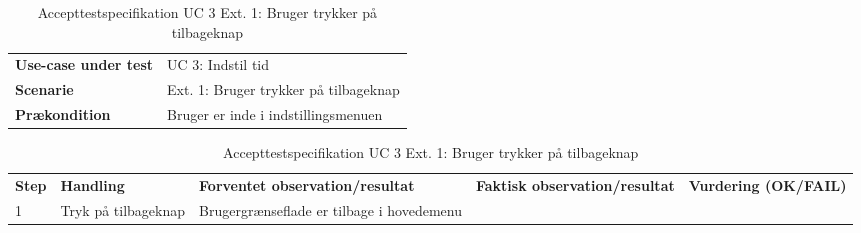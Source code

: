 \begin{table}[H]
	\centering
	\caption{Accepttestspecifikation UC 3 Ext. 1: Bruger trykker på tilbageknap}
	\label{ATUC1:Ext1}
	\begin{tabular}{ p{80pt}  p{320pt} }\hline
		\rowcolor{lightgray}	
		\textbf{Use-case under test} & UC 3: Indstil tid \\
		\rowcolor{white}
		\textbf{Scenarie} & Ext. 1: Bruger trykker på tilbageknap \\\rowcolor{lightgray}	
		\textbf{Prækondition} &
		Bruger er inde i indstillingsmenuen \\
		\hline
	\end{tabular}
	\begin{tabular}{  p{26pt} p{100pt}  p{101pt} | p{67pt} | p{68pt}}
		\textbf{Step} & \textbf{Handling} & \textbf{Forventet observation/resultat} & \textbf{Faktisk observation/resultat} & \textbf{Vurdering (OK/FAIL)}\\
		1 & Tryk på tilbageknap & Brugergrænseflade er tilbage i hovedemenu
 &  &  \\
		\hline
	\end{tabular}
\end{table}

